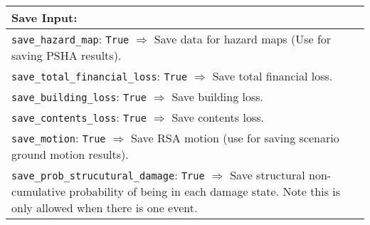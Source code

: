 \documentclass[a4paper, 12pt]{report}
\begin{document}
\vspace{2em}
\begin{tabular}{|p{\textwidth}|}
\hline
\vspace{0.3em} \noindent \Large \textbf{Save Input:} \normalsize \\
\hline
\vspace{0.1em} \texttt{save\_hazard\_map}:
\texttt{True} $\Rightarrow$ Save data for hazard maps (Use for saving PSHA results). \\
\hline
\vspace{0.1em} \texttt{save\_total\_financial\_loss}:
\texttt{True} $\Rightarrow$ Save total financial loss. \\
 \hline
\vspace{0.1em} \texttt{save\_building\_loss}:
\texttt{True} $\Rightarrow$ Save building loss. \\
 \hline
\vspace{0.1em} \texttt{save\_contents\_loss}:
 \texttt{True} $\Rightarrow$ Save contents loss. \\
\hline
\vspace{0.1em} \texttt{save\_motion}:
\texttt{True} $\Rightarrow$ Save RSA motion (use for saving scenario ground motion results). \\
\hline
\vspace{0.1em} \texttt{save\_prob\_strucutural\_damage}:
\texttt{True} $\Rightarrow$ Save structural non-cumulative probability of being in each
damage state.  Note this is only allowed when there is one event. \\
\hline
 \end{tabular}
\end{document}
